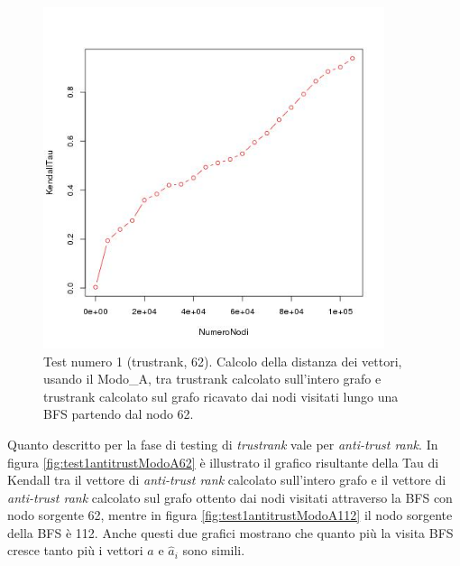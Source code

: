  \begin{figure}
\centering
 \includegraphics[width=10cm]{immagini/test1/trustranktestMode0_62}
 \caption{Test numero 1 (trustrank, 62). Calcolo della distanza dei vettori, usando il Modo\_A, tra trustrank calcolato sull'intero grafo e trustrank calcolato sul grafo ricavato dai nodi visitati lungo una BFS partendo dal nodo 62.}
 \label{fig:test1trustModoA62}
\end{figure}

Quanto descritto per la fase di testing di \textit{trustrank} vale per \textit{anti-trust rank}. In figura \ref{fig:test1antitrustModoA62} è illustrato il grafico risultante della Tau di Kendall tra il vettore di \textit{anti-trust rank} calcolato sull'intero grafo e il vettore di \textit{anti-trust rank} calcolato sul grafo ottento dai nodi visitati attraverso la BFS con nodo sorgente 62, mentre in figura \ref{fig:test1antitrustModoA112} il nodo sorgente della BFS è 112. Anche questi due grafici mostrano che quanto più la visita BFS cresce tanto più i vettori \(a\) e \(\hat{a}_i\) sono simili.


